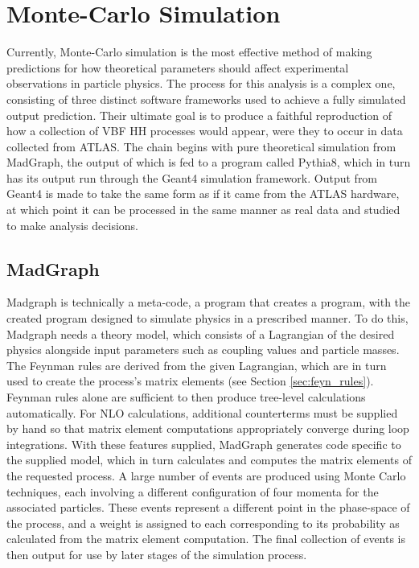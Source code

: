 \FloatBarrier
\section{Monte-Carlo Simulation} \label{sec:mcsim}
    
    Currently, Monte-Carlo simulation is the most effective method of making predictions
        for how theoretical parameters should affect experimental observations in particle physics.
    The process for this analysis is a complex one, 
        consisting of three distinct software frameworks used to achieve a fully simulated output prediction.
    Their ultimate goal is to produce a faithful reproduction of how a collection of VBF \to HH processes would appear,
        were they to occur in data collected from ATLAS.
    The chain begins with pure theoretical simulation from MadGraph,
        the output of which is fed to a program called Pythia8,
        which in turn has its output run through the Geant4 simulation framework.
    Output from Geant4 is made to take the same form as if it came from the ATLAS hardware,
        at which point it can be processed in the same manner as real data and studied to make analysis decisions.


    \subsection{MadGraph}

    Madgraph is technically a meta-code, a program that creates a program,
        with the created program designed to simulate physics in a prescribed manner.
    To do this, Madgraph needs a theory model, which consists of a Lagrangian of the desired physics
        alongside input parameters such as coupling values and particle masses.
    The Feynman rules are derived from the given Lagrangian,
        which are in turn used to create the process's matrix elements (see Section \ref{sec:feyn_rules}).
    Feynman rules alone are sufficient to then produce tree-level calculations automatically.
    For NLO calculations, additional counterterms must be supplied by hand
        so that matrix element computations appropriately converge during loop integrations. 
    With these features supplied, MadGraph generates code specific to the supplied model,
        which in turn calculates and computes the matrix elements of the requested process\cite{madgraph}.
    A large number of events are produced using Monte Carlo techniques,
        each involving a different configuration of four momenta for the associated particles.
    These events represent a different point in the phase-space of the process,
        and a weight is assigned to each corresponding to its probability as calculated from the matrix element computation.
    The final collection of events is then output for use by later stages of the simulation process.

